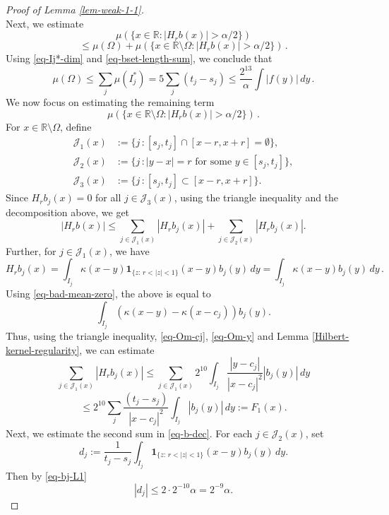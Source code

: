 {\begin{proof}[Proof of Lemma \ref{lem-weak-1-1}]
\begin{equation}
\end{equation}
Next, we estimate
$$\mu\left(\{x\in \mathbb{R}: |H_r b(x)|>\alpha/2\}\right) $$
$$
    \le \mu (\Omega) +  \mu\left(\{x\in \mathbb{R}\setminus\Omega: |H_r b(x)|>{\alpha}/2\}\right)\,.
$$
Using \eqref{eq-Ij*-dim} and \eqref{eq-bset-length-sum}, we conclude that
\begin{equation}
    \label{eq-omega-bd}
    \mu(\Omega) \le \sum_{j} \mu (I_j^*)
    = 5 \sum_{j} (t_j-s_j)\leq \frac{2^{13}}{\alpha} \int |f(y)|\, dy\,.
\end{equation}
We now focus on estimating the remaining term
$$\mu\left(\{x\in \mathbb{R}\setminus\Omega: |H_r b(x)|>{\alpha}/2\}\right)\,.$$
For $x\in \mathbb{R}\setminus\Omega$, define
\begin{align*}
    \mathcal{J}_1(x)&:=\{j\,:[s_j, t_j]\cap [x-r, x+r]=\emptyset \},\\
    \mathcal{J}_2(x)&:=\{j\,: |y-x|=r \text{ for some } y \in [s_j, t_j]\},\\
    \mathcal{J}_3(x)&:=\{j\,: [s_j, t_j]\subset [x-r, x+r]\}.
\end{align*}
Since $H_rb_j(x)=0$ for all $j\in \mathcal{J}_3(x)$, using the triangle inequality and the decomposition above, we get
\begin{equation}
    \label{eq-b-dec}
    |H_r b(x)|\leq \sum_{j\in \mathcal{J}_1(x)} |H_rb_j(x)|+\sum_{j\in \mathcal{J}_2(x)} |H_rb_j(x)|.
\end{equation}
Further, for $j\in \mathcal{J}_1(x)$, we have
$$H_rb_j(x)=\int_{I_j} \kappa (x-y)\mathbf{1}_{\{z:\, r<|z|<1\}}(x-y) b_j(y)\,dy=\int_{I_j} \kappa (x-y) b_j(y)\,dy\,.$$
Using \eqref{eq-bad-mean-zero}, the above is equal to
$$\int_{I_j} (\kappa (x-y)-\kappa(x-c_j)) b_j(y).$$
Thus, using the triangle inequality, \eqref{eq-Om-cj}, \eqref{eq-Om-y} and Lemma \ref{Hilbert-kernel-regularity}, we can estimate
$$\sum_{j\in \mathcal{J}_1(x)} |H_rb_j(x)|\leq \sum_{j\in \mathcal{J}_1(x)}2^{10}\int_{I_j}\frac{|y-c_j|}{|x-c_j|^2} |b_j(y)|\, dy$$
\begin{equation}
    \label{eq-J1-diff-est}
    \leq 2^{10}\sum_{j} \frac{(t_j-s_j)}{|x-c_j|^2}\int_{I_j} |b_j(y)|\, dy:=F_1(x).
\end{equation}
Next, we estimate the second sum in \eqref{eq-b-dec}. For each $j\in \mathcal{J}_2(x)$, set
$$d_j:=\frac{1}{t_j-s_j}\int_{I_j} \mathbf{1}_{\{z:\, r<|z|<1\}}(x-y) b_j(y)\, dy.$$
Then by \eqref{eq-bj-L1}
\begin{equation}
    \label{eq-dj-est}
    |d_j|\leq 2\cdot 2^{-10} \alpha=2^{-9}\alpha.
\end{equation}

\end{proof}}
